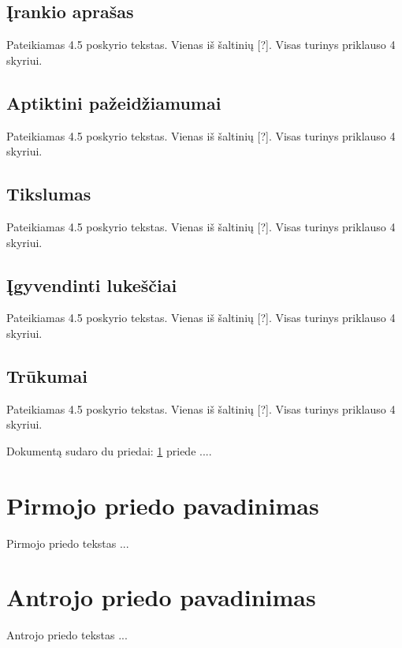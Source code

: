\documentclass[a4paper,12pt,fleqn]{article}
\begin{document}
\subsection{Įrankio aprašas}
\label{sec:example}

Pateikiamas 4.5 poskyrio tekstas. Vienas iš šaltinių [?]. Visas turinys priklauso 4 skyriui.

\subsection{Aptiktini pažeidžiamumai}
\label{sec:example}

Pateikiamas 4.5 poskyrio tekstas. Vienas iš šaltinių [?]. Visas turinys priklauso 4 skyriui.

\subsection{Tikslumas}
\label{sec:example}

Pateikiamas 4.5 poskyrio tekstas. Vienas iš šaltinių [?]. Visas turinys priklauso 4 skyriui.

\subsection{Įgyvendinti lukeščiai}
\label{sec:example}

Pateikiamas 4.5 poskyrio tekstas. Vienas iš šaltinių [?]. Visas turinys priklauso 4 skyriui.

\subsection{Trūkumai}
\label{sec:example}

Pateikiamas 4.5 poskyrio tekstas. Vienas iš šaltinių [?]. Visas turinys priklauso 4 skyriui.









\newpage
\begin{appendices}
Dokumentą sudaro du priedai: \ref{app:a} priede  ....
\newpage
\section{Pirmojo priedo pavadinimas}
\label{app:a}
Pirmojo priedo tekstas ...

\newpage
\section{Antrojo priedo pavadinimas}
Antrojo priedo tekstas ...

\end{appendices}
\end{document}
